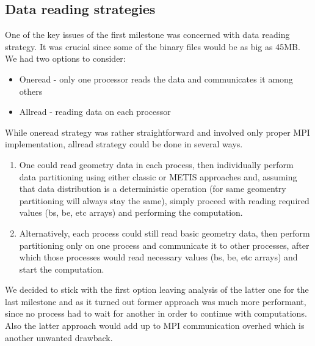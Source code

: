 \documentclass{article}
\begin{document}
\subsection{Data reading strategies}
One of the key issues of the first milestone was concerned with data reading strategy. It was crucial since some of the binary files would be as big as 45MB. We had two options to consider:
\begin{itemize}
	\item Oneread - only one processor reads the data and communicates it among others
	\item Allread - reading data on each processor
\end{itemize}
While oneread strategy was rather straightforward and involved only proper MPI implementation, allread strategy could be done in several ways. 
\begin{enumerate}
	\item One could read geometry data in each process, then individually perform data partitioning using either classic or METIS approaches and, assuming that data distribution is a deterministic operation (for same geomentry partitioning will always stay the same), simply proceed with reading required values (bs, be, etc arrays) and performing the computation.
	\item Alternatively, each process could still read basic geometry data, then perform partitioning only on one process and communicate it to other processes, after which those processes would read necessary values (bs, be, etc arrays) and start the computation.
\end{enumerate}
We decided to stick with the first option leaving analysis of the latter one for the last milestone and as it turned out former approach was much more performant, since no process had to wait for another in order to continue with computations. Also the latter approach would add up to MPI communication overhed which is another unwanted drawback.
\end{document}
